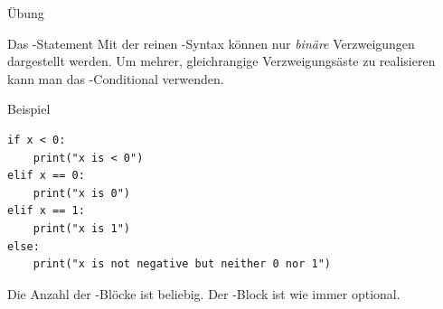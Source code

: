 \begin{frame}{Übung}

\end{frame}

\begin{fragile}

\begin{block}{Das -Statement}
	\vspace{2pt}
Mit der reinen -Syntax können nur \emph{binäre} Verzweigungen dargestellt werden. Um mehrer, gleichrangige Verzweigungsäste zu realisieren kann man das -Conditional verwenden. 
\end{block}
\pause
\begin{exampleblock}{Beispiel}
\begin{verbatim}
if x < 0: 
    print("x is < 0")
elif x == 0: 
    print("x is 0")
elif x == 1: 
    print("x is 1")
else: 
    print("x is not negative but neither 0 nor 1")         
\end{verbatim}
\end{exampleblock}
\pause
Die Anzahl der -Blöcke ist beliebig. Der -Block ist wie immer optional. 

\end{fragile}

